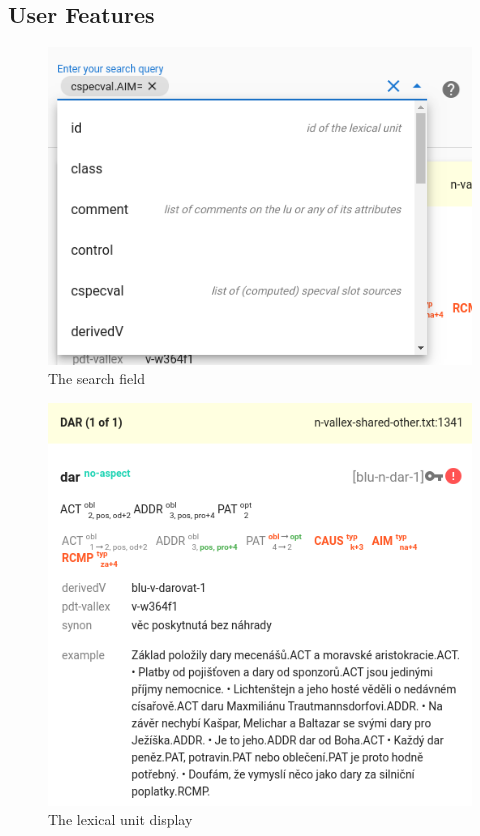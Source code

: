 \documentclass[10pt, a4paper]{article}
\begin{document}
\subsection{User Features}


\begin{figure}
    \includegraphics[width=\hsize]{images/ui-search.png}
    \caption{\label{fig:ui-search}The search field}
\end{figure}

\begin{figure}
    \includegraphics[width=\hsize]{images/ui-lexical-unit.png}
    \caption{\label{fig:ui-lexical-unit}The lexical unit display}
\end{figure}
\end{document}
